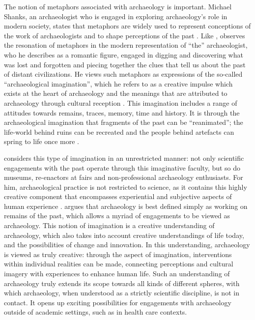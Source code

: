 	The notion of metaphors associated with archaeology is important. Michael Shanks, an archaeologist who is engaged in exploring archaeology’s role in modern society, states that metaphors are widely used to represent conceptions of the work of archaeologists and to shape perceptions of the past \parencite[25, 64]{Shanks_2012a}. 
Like \citeauthor{Holtorf_2005}, \citeauthor{Shanks_2012a} observes the resonation of metaphors in the modern representation of “the” archaeologist, who he describes as a romantic figure, engaged in digging and discovering what was lost and forgotten and piecing together the clues that tell us about the past of distant civilizations. He views such metaphors as expressions of the so-called “archaeological imagination”, which he refers to as a creative impulse which exists at the heart of archaeology and the meanings that are attributed to archaeology through cultural reception \parencite[25]{Shanks_2012a}. This imagination includes a range of attitudes towards remains, traces, memory, time and history. It is through the archaeological imagination that fragments of the past can be “reanimated”; the life-world behind ruins can be recreated and the people behind artefacts can spring to life once more \parencite[9, 25]{Shanks_2012a}.
	
	\textcite[17]{Shanks_2012a} considers this type of imagination in an unrestricted manner: not only scientific engagements with the past operate through this imaginative faculty, but so do museums, re-enactors at fairs and non-professional archaeology enthusiasts. For him, archaeological practice is not restricted to science, as it contains this highly creative component that encompasses experiential and subjective aspects of human experience \parencite[17]{Shanks_2012a}. \textcite[17--18]{Shanks_2012a} argues that archaeology is best defined simply as working on remains of the past, which allows a myriad of engagements to be viewed as archaeology. This notion of imagination is a creative understanding of archaeology, which also takes into account creative understandings of life today, and the possibilities of change and innovation. In this understanding, archaeology is viewed as truly creative: through the aspect of imagination, interventions within individual realities can be made, connecting perceptions and cultural imagery with experiences to enhance human life. Such an understanding of archaeology truly extends its scope towards all kinds of different spheres, with which archaeology, when understood as a strictly scientific discipline, is not in contact. It opens up exciting possibilities for engagements with archaeology outside of academic settings, such as in health care contexts.
	 		
